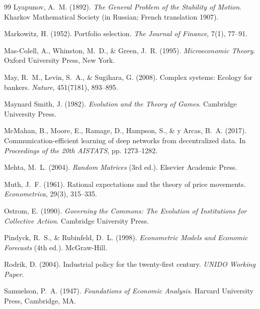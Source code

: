 \documentclass[a4paper, 12pt, twoside, openright]{report}
\theoremstyle{definition}
\theoremstyle{definition}
\begin{document}
\begin{thebibliography}{99}
Lyapunov, A.~M. (1892).
\newblock \emph{The General Problem of the Stability of Motion}.
\newblock Kharkov Mathematical Society (in Russian; French translation 1907).

Markowitz, H. (1952).
\newblock Portfolio selection.
\newblock \emph{The Journal of Finance}, 7(1), 77--91.

Mas-Colell, A., Whinston, M.~D., \& Green, J.~R. (1995).
\newblock \emph{Microeconomic Theory}.
\newblock Oxford University Press, New York.

May, R.~M., Levin, S.~A., \& Sugihara, G. (2008).
\newblock Complex systems: Ecology for bankers.
\newblock \emph{Nature}, 451(7181), 893--895.

Maynard Smith, J. (1982).
\newblock \emph{Evolution and the Theory of Games}.
\newblock Cambridge University Press.

McMahan, B., Moore, E., Ramage, D., Hampson, S., \& y Arcas, B.~A. (2017).
\newblock Communication-efficient learning of deep networks from decentralized data.
\newblock In \emph{Proceedings of the 20th AISTATS}, pp. 1273--1282.

Mehta, M.~L. (2004).
\newblock \emph{Random Matrices} (3rd ed.).
\newblock Elsevier Academic Press.

Muth, J.~F. (1961).
\newblock Rational expectations and the theory of price movements.
\newblock \emph{Econometrica}, 29(3), 315--335.

Ostrom, E. (1990).
\newblock \emph{Governing the Commons: The Evolution of Institutions for Collective Action}.
\newblock Cambridge University Press.

Pindyck, R.~S., \& Rubinfeld, D.~L. (1998).
\newblock \emph{Econometric Models and Economic Forecasts} (4th ed.).
\newblock McGraw-Hill.

Rodrik, D. (2004).
\newblock Industrial policy for the twenty-first century.
\newblock \emph{UNIDO Working Paper}.

Samuelson, P.~A. (1947).
\newblock \emph{Foundations of Economic Analysis}.
\newblock Harvard University Press, Cambridge, MA.


\end{thebibliography}
\end{document}
